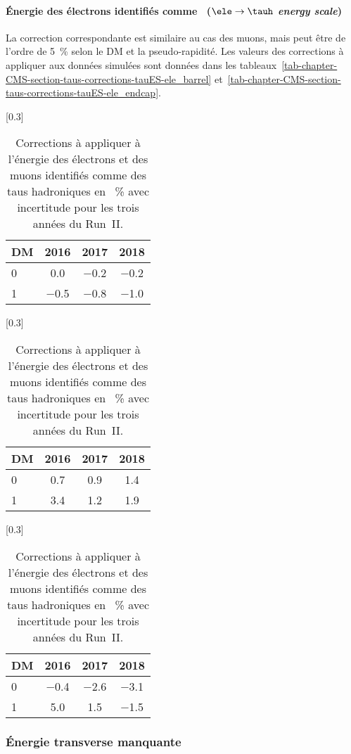 \paragraph{Énergie des électrons identifiés comme \tauh\ (\emph{$\ele\to\tauh$ energy scale})}
La correction correspondante est similaire au cas des muons, mais peut être de l'ordre de \SI{5}{\%} selon le DM et la pseudo-rapidité.
Les valeurs des corrections à appliquer aux données simulées sont données dans les tableaux~\ref{tab-chapter-CMS-section-taus-corrections-tauES-ele_barrel} et~\ref{tab-chapter-CMS-section-taus-corrections-tauES-ele_endcap}.
\begin{table}[h]
\centering
{}[0.3\textwidth]
{\begin{tabular}{lccc}
\toprule
DM & 2016 & 2017 & 2018\\
\midrule
0 & \num{0.0} & \num{-0.2} & \num{-0.2} \\
1 & \num{-0.5} & \num{-0.8} & \num{-1.0} \\
\bottomrule
\end{tabular}}
\hfill
{}[0.3\textwidth]
{\begin{tabular}{lccc}
\toprule
DM & 2016 & 2017 & 2018\\
\midrule
0 & \num{0.7} & \num{0.9} & \num{1.4} \\
1 & \num{3.4} & \num{1.2} & \num{1.9} \\
\bottomrule
\end{tabular}}
\hfill
{}[0.3\textwidth]
{\begin{tabular}{lccc}
\toprule
DM & 2016 & 2017 & 2018\\
\midrule
0 & \num{-0.4} & \num{-2.6} & \num{-3.1} \\
1 & \num{5.0} & \num{1.5} & \num{-1.5} \\
\bottomrule
\end{tabular}}
\caption[Corrections à l'énergie des leptons identifiés comme des taus hadroniques.]{Corrections à appliquer à l'énergie des électrons et des muons identifiés comme des taus hadroniques en \SI{}{\%} avec incertitude pour les trois années du Run~II.}
\label{tab-chapter-CMS-section-taus-corrections-tauES-leptons}
\end{table}
\subsubsection{Énergie transverse manquante}
